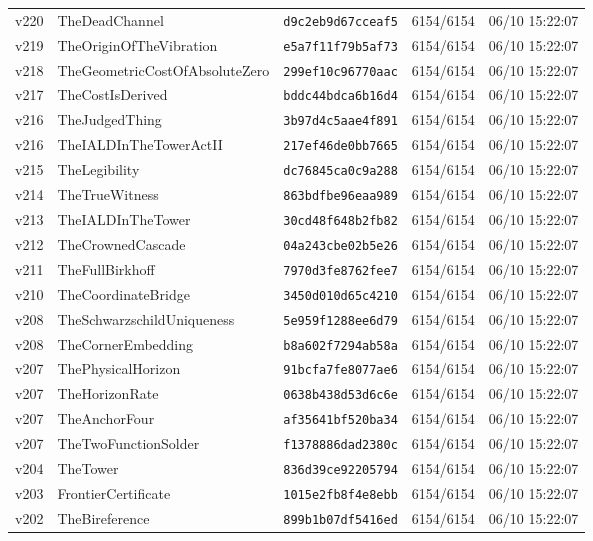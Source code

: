 \documentclass[11pt]{article}
\theoremstyle{definition}\newtheorem{deriv}{Derivation}
\begin{document}
{\begin{longtable}{@{}lllll@{}}
v220 & TheDeadChannel & \texttt{d9c2eb9d67cceaf5} & 6154/6154 & 06/10 15:22:07 \\
v219 & TheOriginOfTheVibration & \texttt{e5a7f11f79b5af73} & 6154/6154 & 06/10 15:22:07 \\
v218 & TheGeometricCostOfAbsoluteZero & \texttt{299ef10c96770aac} & 6154/6154 & 06/10 15:22:07 \\
v217 & TheCostIsDerived & \texttt{bddc44bdca6b16d4} & 6154/6154 & 06/10 15:22:07 \\
v216 & TheJudgedThing & \texttt{3b97d4c5aae4f891} & 6154/6154 & 06/10 15:22:07 \\
v216 & TheIALDInTheTowerActII & \texttt{217ef46de0bb7665} & 6154/6154 & 06/10 15:22:07 \\
v215 & TheLegibility & \texttt{dc76845ca0c9a288} & 6154/6154 & 06/10 15:22:07 \\
v214 & TheTrueWitness & \texttt{863bdfbe96eaa989} & 6154/6154 & 06/10 15:22:07 \\
v213 & TheIALDInTheTower & \texttt{30cd48f648b2fb82} & 6154/6154 & 06/10 15:22:07 \\
v212 & TheCrownedCascade & \texttt{04a243cbe02b5e26} & 6154/6154 & 06/10 15:22:07 \\
v211 & TheFullBirkhoff & \texttt{7970d3fe8762fee7} & 6154/6154 & 06/10 15:22:07 \\
v210 & TheCoordinateBridge & \texttt{3450d010d65c4210} & 6154/6154 & 06/10 15:22:07 \\
v208 & TheSchwarzschildUniqueness & \texttt{5e959f1288ee6d79} & 6154/6154 & 06/10 15:22:07 \\
v208 & TheCornerEmbedding & \texttt{b8a602f7294ab58a} & 6154/6154 & 06/10 15:22:07 \\
v207 & ThePhysicalHorizon & \texttt{91bcfa7fe8077ae6} & 6154/6154 & 06/10 15:22:07 \\
v207 & TheHorizonRate & \texttt{0638b438d53d6c6e} & 6154/6154 & 06/10 15:22:07 \\
v207 & TheAnchorFour & \texttt{af35641bf520ba34} & 6154/6154 & 06/10 15:22:07 \\
v207 & TheTwoFunctionSolder & \texttt{f1378886dad2380c} & 6154/6154 & 06/10 15:22:07 \\
v204 & TheTower & \texttt{836d39ce92205794} & 6154/6154 & 06/10 15:22:07 \\
v203 & FrontierCertificate & \texttt{1015e2fb8f4e8ebb} & 6154/6154 & 06/10 15:22:07 \\
v202 & TheBireference & \texttt{899b1b07df5416ed} & 6154/6154 & 06/10 15:22:07 \\

\end{longtable}}
\end{document}
